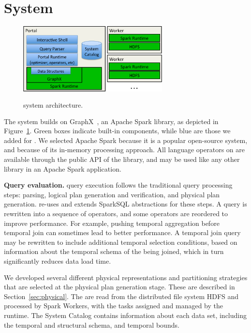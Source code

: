 \section{System}
\label{sec:sys}

\begin{figure}[t!]
\begin{center}
\includegraphics[height=1.4in]{figs/architecture.pdf}
\caption{\ql system architecture.}
\vspace{-0.5cm}
\label{fig:arch}
\vspace{-0.2cm}
\end{center}
\end{figure}

The \ql system builds on GraphX~\cite{DBLP:conf/osdi/GonzalezXDCFS14},
an Apache Spark library, as depicted in Figure~\ref{fig:arch}.  Green
boxes indicate built-in components, while blue are those we added for
\ql.  We selected Apache Spark because it is a popular open-source
system, and because of its in-memory processing approach.  All
language operators on \tgs are available through the public API of the
\ql library, and may be used like any other library in an Apache Spark
application.

{\bf Query evaluation.}  \ql query execution follows the traditional
query processing steps: parsing, logical plan generation and
verification, and physical plan generation.  \ql re-uses and extends
SparkSQL abstractions for these steps.  A \ql query is rewritten into
a sequence of operators, and some operators are reordered to improve
performance.  For example, pushing temporal aggregation before
temporal join can sometimes lead to better performance.  A temporal
join query may be rewritten to include additional temporal selection
conditions, based on information about the temporal schema of the \tgs
being joined, which in turn significantly reduces data load time.

We developed several different physical representations and
partitioning strategies that are selected at the physical plan
generation stage.  These are described in Section~\ref{sec:physical}.
The \tgs are read from the distributed file system HDFS and processed
by Spark Workers, with the tasks assigned and managed by the runtime.
The System Catalog contains information about each data set, including
the temporal and structural schema, and temporal bounds.

